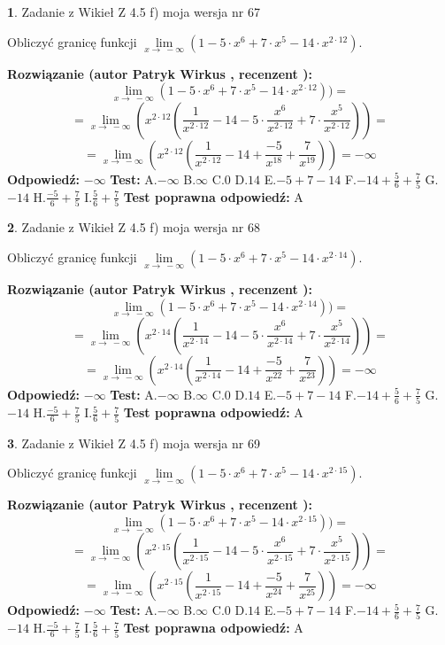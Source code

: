 \documentclass[12pt, a4paper]{article}
\theoremstyle{definition} %
\newtheorem{zad}{}
\newcommand{\zadStart}[1]{\begin{zad}#1\newline}
\newcommand{\zadStop}{\end{zad}}
\newcommand{\rozwStart}[2]{\noindent \textbf{Rozwiązanie (autor #1 , recenzent #2): }\newline}
\newcommand{\rozwStop}{\newline}
\newcommand{\odpStart}{\noindent \textbf{Odpowiedź:}\newline}
\newcommand{\odpStop}{\newline}
\newcommand{\testStart}{\noindent \textbf{Test:}\newline}
\newcommand{\testStop}{\newline}
\newcommand{\kluczStart}{\noindent \textbf{Test poprawna odpowiedź:}\newline}
\newcommand{\kluczStop}{\newline}
\begin{document}
\zadStart{Zadanie z Wikieł Z 4.5 f) moja wersja nr 67}



Obliczyć granicę funkcji  $\lim\limits_{x\to\ -\infty}(1 - 5 \cdot x^{6}+7 \cdot x^{5}- 14 \cdot x^{2\cdot12})$.
\zadStop
\rozwStart{Patryk Wirkus}{}
$$\lim\limits_{x\to\ -\infty}(1 - 5 \cdot x^{6}+7 \cdot x^{5}- 14 \cdot x^{2\cdot12}))=$$
$$=\lim\limits_{x\to\ -\infty}(x^{2\cdot12}(\frac{1}{x^{2\cdot12}}-14 -5 \cdot \frac{x^{6}}{x^{2\cdot12}}+7 \cdot \frac{x^{5}}{x^{2\cdot12}}))=$$
$$=\lim\limits_{x\to\ -\infty}(x^{2\cdot12}(\frac{1}{x^{2\cdot12}}-14 + \frac{-5}{x^{18}}+ \frac{7}{x^{19}}))=-\infty$$
\rozwStop
\odpStart
$-\infty$
\odpStop
\testStart
A.$-\infty$ B.$\infty$ C.$0$ D.$14$ E.$-5 + 7 - 14$
F.$-14+\frac{5}{6}+\frac{7}{5}$ G.$-14$
H.$\frac{-5}{6}+\frac{7}{5}$
I.$\frac{5}{6}+\frac{7}{5}$
\testStop
\kluczStart
A
\kluczStop



\zadStart{Zadanie z Wikieł Z 4.5 f) moja wersja nr 68}



Obliczyć granicę funkcji  $\lim\limits_{x\to\ -\infty}(1 - 5 \cdot x^{6}+7 \cdot x^{5}- 14 \cdot x^{2\cdot14})$.
\zadStop
\rozwStart{Patryk Wirkus}{}
$$\lim\limits_{x\to\ -\infty}(1 - 5 \cdot x^{6}+7 \cdot x^{5}- 14 \cdot x^{2\cdot14}))=$$
$$=\lim\limits_{x\to\ -\infty}(x^{2\cdot14}(\frac{1}{x^{2\cdot14}}-14 -5 \cdot \frac{x^{6}}{x^{2\cdot14}}+7 \cdot \frac{x^{5}}{x^{2\cdot14}}))=$$
$$=\lim\limits_{x\to\ -\infty}(x^{2\cdot14}(\frac{1}{x^{2\cdot14}}-14 + \frac{-5}{x^{22}}+ \frac{7}{x^{23}}))=-\infty$$
\rozwStop
\odpStart
$-\infty$
\odpStop
\testStart
A.$-\infty$ B.$\infty$ C.$0$ D.$14$ E.$-5 + 7 - 14$
F.$-14+\frac{5}{6}+\frac{7}{5}$ G.$-14$
H.$\frac{-5}{6}+\frac{7}{5}$
I.$\frac{5}{6}+\frac{7}{5}$
\testStop
\kluczStart
A
\kluczStop



\zadStart{Zadanie z Wikieł Z 4.5 f) moja wersja nr 69}



Obliczyć granicę funkcji  $\lim\limits_{x\to\ -\infty}(1 - 5 \cdot x^{6}+7 \cdot x^{5}- 14 \cdot x^{2\cdot15})$.
\zadStop
\rozwStart{Patryk Wirkus}{}
$$\lim\limits_{x\to\ -\infty}(1 - 5 \cdot x^{6}+7 \cdot x^{5}- 14 \cdot x^{2\cdot15}))=$$
$$=\lim\limits_{x\to\ -\infty}(x^{2\cdot15}(\frac{1}{x^{2\cdot15}}-14 -5 \cdot \frac{x^{6}}{x^{2\cdot15}}+7 \cdot \frac{x^{5}}{x^{2\cdot15}}))=$$
$$=\lim\limits_{x\to\ -\infty}(x^{2\cdot15}(\frac{1}{x^{2\cdot15}}-14 + \frac{-5}{x^{24}}+ \frac{7}{x^{25}}))=-\infty$$
\rozwStop
\odpStart
$-\infty$
\odpStop
\testStart
A.$-\infty$ B.$\infty$ C.$0$ D.$14$ E.$-5 + 7 - 14$
F.$-14+\frac{5}{6}+\frac{7}{5}$ G.$-14$
H.$\frac{-5}{6}+\frac{7}{5}$
I.$\frac{5}{6}+\frac{7}{5}$
\testStop
\kluczStart
A
\kluczStop
\end{document}
